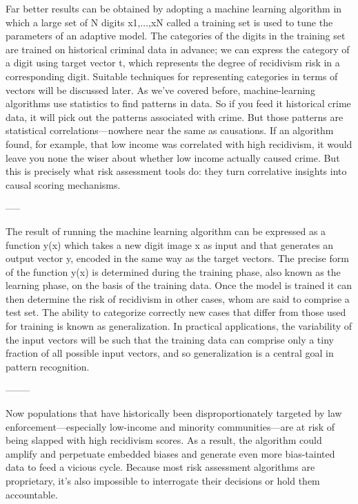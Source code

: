 \documentclass[7pt]{article}
\begin{document}
Far better results can be obtained by adopting a machine learning algorithm in which a large set of N digits {x1,...,xN} called a training set is used to tune the parameters of an adaptive model. The categories of the digits in the training set are trained on historical criminal data in advance; we can express the category of a digit using target vector t, which represents the degree of recidivism risk in a corresponding digit. Suitable techniques for representing categories in terms of vectors will be discussed later.  As we’ve covered before, machine-learning algorithms use statistics to find patterns in data. So if you feed it historical crime data, it will pick out the patterns associated with crime. But those patterns are statistical correlations—nowhere near the same as causations. If an algorithm found, for example, that low income was correlated with high recidivism, it would leave you none the wiser about whether low income actually caused crime. But this is precisely what risk assessment tools do: they turn correlative insights into causal scoring mechanisms.

-----
		 
The result of running the machine learning algorithm can be expressed as a function y(x) which takes a new digit image x as input and that generates an output vector y, encoded in the same way as the target vectors. The precise form of the function y(x) is determined during the training phase, also known as the learning phase, on the basis of the training data. Once the model is trained it can then determine the risk of recidivism in other cases, whom are said to comprise a test set. The ability to categorize correctly new cases that differ from those used for training is known as generalization. In practical applications, the variability of the input vectors will be such that the training data can comprise only a tiny fraction of all possible input vectors, and so generalization is a central goal in pattern recognition.
		 
		 --------
		 
Now populations that have historically been disproportionately targeted by law enforcement—especially low-income and minority communities—are at risk of being slapped with high recidivism scores. As a result, the algorithm could amplify and perpetuate embedded biases and generate even more bias-tainted data to feed a vicious cycle. Because most risk assessment algorithms are proprietary, it’s also impossible to interrogate their decisions or hold them accountable.
		 
\end{document}
